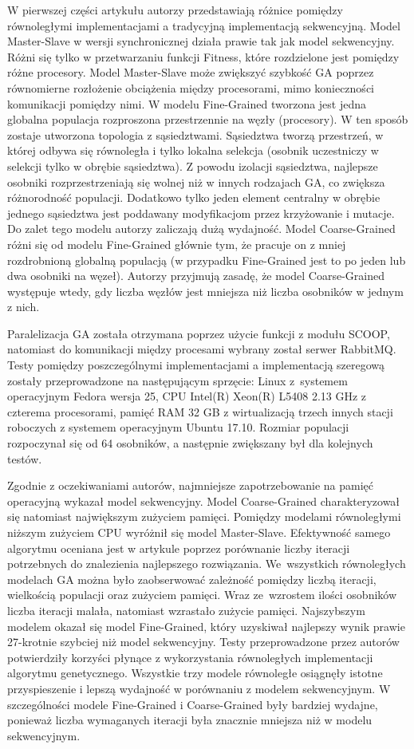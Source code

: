 \documentclass[12pt]{article}
\begin{document}
W pierwszej części artykułu autorzy przedstawiają różnice pomiędzy równoległymi implementacjami a tradycyjną implementacją sekwencyjną. Model Master-Slave w wersji synchronicznej
działa prawie tak jak model sekwencyjny. Różni się tylko w przetwarzaniu funkcji Fitness, które rozdzielone jest pomiędzy różne procesory. Model Master-Slave może
zwiększyć szybkość GA poprzez równomierne rozłożenie obciążenia między procesorami, mimo konieczności komunikacji pomiędzy nimi. W modelu Fine-Grained tworzona jest jedna
globalna populacja rozproszona przestrzennie na węzły (procesory). W ten sposób zostaje utworzona topologia z sąsiedztwami. Sąsiedztwa tworzą przestrzeń, w której odbywa się równoległa i
tylko lokalna selekcja (osobnik uczestniczy w selekcji tylko w obrębie sąsiedztwa). Z powodu izolacji sąsiedztwa, najlepsze osobniki rozprzestrzeniają się wolnej niż w innych rodzajach GA,
co zwiększa różnorodność populacji. Dodatkowo tylko jeden element centralny w obrębie jednego sąsiedztwa jest poddawany modyfikacjom przez krzyżowanie i mutacje. Do zalet tego modelu
autorzy zaliczają dużą wydajność. Model Coarse-Grained różni się od modelu Fine-Grained głównie tym, że pracuje on z mniej rozdrobnioną globalną populacją (w przypadku Fine-Grained
jest to po jeden lub dwa osobniki na węzeł). Autorzy przyjmują zasadę, że model Coarse-Grained występuje wtedy, gdy liczba węzłów jest mniejsza niż liczba osobników w jednym z nich.

Paralelizacja GA została otrzymana poprzez użycie funkcji z modułu SCOOP, natomiast do komunikacji między procesami wybrany został serwer RabbitMQ. Testy pomiędzy poszczególnymi
implementacjami a implementacją szeregową zostały przeprowadzone na następującym sprzęcie: Linux z~systemem operacyjnym Fedora wersja 25, CPU Intel(R) Xeon(R) L5408
2.13 GHz z czterema procesorami, pamięć RAM 32 GB z wirtualizacją trzech innych stacji roboczych z systemem operacyjnym Ubuntu 17.10. Rozmiar populacji rozpoczynał się od
64 osobników, a następnie zwiększany był dla kolejnych testów.

Zgodnie z oczekiwaniami autorów, najmniejsze zapotrzebowanie na pamięć operacyjną wykazał model sekwencyjny. Model Coarse-Grained charakteryzował się natomiast największym
zużyciem pamięci. Pomiędzy modelami równoległymi niższym zużyciem CPU wyróżnił się model Master-Slave. Efektywność samego algorytmu oceniana jest w artykule poprzez porównanie
liczby iteracji potrzebnych do znalezienia najlepszego rozwiązania. We~wszystkich równoległych modelach GA można było zaobserwować zależność pomiędzy liczbą iteracji, wielkością
populacji oraz zużyciem pamięci. Wraz ze~wzrostem ilości osobników liczba iteracji malała, natomiast wzrastało zużycie pamięci. Najszybszym modelem okazał się model Fine-Grained,
który uzyskiwał najlepszy wynik prawie 27-krotnie szybciej niż model sekwencyjny. Testy przeprowadzone przez autorów potwierdziły korzyści płynące z wykorzystania równoległych
implementacji algorytmu genetycznego. Wszystkie trzy modele równoległe osiągnęły istotne przyspieszenie i lepszą wydajność w porównaniu z modelem sekwencyjnym. W szczególności
modele Fine-Grained i Coarse-Grained były bardziej wydajne, ponieważ liczba wymaganych iteracji była znacznie mniejsza niż w modelu sekwencyjnym.
\end{document}
